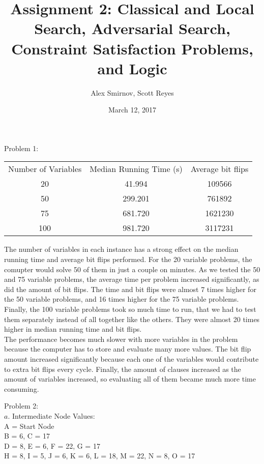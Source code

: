 \documentclass[11pt, oneside]{article}   	%
\title{Assignment 2: Classical and Local Search, Adversarial Search, Constraint Satisfaction Problems, and Logic}
\author{Alex Smirnov, Scott Reyes}
\date{March 12, 2017}							%
\begin{document}
\maketitle
\begin{flushleft}

Problem 1:
\begin{center}
\begin{tabular}{ |c|c|c|} 
\hline
Number of Variables & Median Running Time (s) & Average bit flips \\ 
20 & 41.994 & 109566 \\
50 & 299.201 & 761892 \\
75 & 681.720 & 1621230 \\
100 & 981.720 & 3117231 \\
\hline
\end{tabular}
\end{center}

The number of variables in each instance has a strong effect on the median running time and average bit flips performed. For the 20 variable problems, the comupter would solve 50 of them in just a couple on minutes. As we tested the 50 and 75 variable problems, the average time per problem increased significantly, as did the amount of bit flips. The time and bit flips were almost 7 times higher for the 50 variable problems, and 16 times higher for the 75 variable problems. Finally, the 100 variable problems took so much time to run, that we had to test them separately instead of all together like the others. They were almost 20 times higher in median running time and bit flips. \\\medskip
The performance becomes much slower with more variables in the problem because the computer has to store and evaluate many more values. The bit flip amount increased significantly because each one of the variables would contribute to extra bit flips every cycle. Finally, the amount of clauses increased as the amount of variables increased, so evaluating all of them became much more time consuming.\\\medskip

Problem 2: \\
$a$. Intermediate Node Values:\\
A = Start Node \\
B = 6, C = 17 \\
D = 8, E = 6, F = 22, G = 17 \\
H = 8, I = 5, J = 6, K = 6, L = 18, M = 22, N = 8, O = 17 \\\medskip


\end{flushleft}
\end{document}
